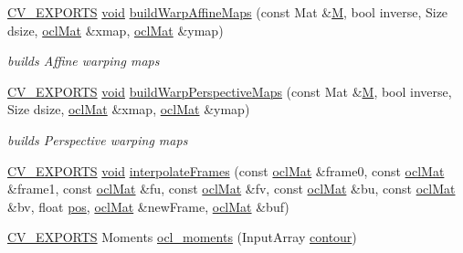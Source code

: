 \begin{DoxyCompactItemize}
\hyperlink{core_2types__c_8h_a1bf9f0e121b54272da02379cfccd0a2b}{C\-V\-\_\-\-E\-X\-P\-O\-R\-T\-S} \hyperlink{legacy_8hpp_a8bb47f092d473522721002c86c13b94e}{void} \hyperlink{namespacecv_1_1ocl_a53b08ee331f9b22d410e3f7a1f154081}{build\-Warp\-Affine\-Maps} (const Mat \&\hyperlink{tracking_8hpp_aa81fa9fd378ecf463757e9274a136e70}{M}, bool inverse, Size dsize, \hyperlink{classcv_1_1ocl_1_1oclMat}{ocl\-Mat} \&xmap, \hyperlink{classcv_1_1ocl_1_1oclMat}{ocl\-Mat} \&ymap)
\begin{DoxyCompactList}\small\item\em builds Affine warping maps \end{DoxyCompactList}\item 
\hyperlink{core_2types__c_8h_a1bf9f0e121b54272da02379cfccd0a2b}{C\-V\-\_\-\-E\-X\-P\-O\-R\-T\-S} \hyperlink{legacy_8hpp_a8bb47f092d473522721002c86c13b94e}{void} \hyperlink{namespacecv_1_1ocl_a833d8278ce3cc3a2f3bacd900b29a329}{build\-Warp\-Perspective\-Maps} (const Mat \&\hyperlink{tracking_8hpp_aa81fa9fd378ecf463757e9274a136e70}{M}, bool inverse, Size dsize, \hyperlink{classcv_1_1ocl_1_1oclMat}{ocl\-Mat} \&xmap, \hyperlink{classcv_1_1ocl_1_1oclMat}{ocl\-Mat} \&ymap)
\begin{DoxyCompactList}\small\item\em builds Perspective warping maps \end{DoxyCompactList}\item 
\hyperlink{core_2types__c_8h_a1bf9f0e121b54272da02379cfccd0a2b}{C\-V\-\_\-\-E\-X\-P\-O\-R\-T\-S} \hyperlink{legacy_8hpp_a8bb47f092d473522721002c86c13b94e}{void} \hyperlink{namespacecv_1_1ocl_a648325408f99a52fe9382683e5b1b095}{interpolate\-Frames} (const \hyperlink{classcv_1_1ocl_1_1oclMat}{ocl\-Mat} \&frame0, const \hyperlink{classcv_1_1ocl_1_1oclMat}{ocl\-Mat} \&frame1, const \hyperlink{classcv_1_1ocl_1_1oclMat}{ocl\-Mat} \&fu, const \hyperlink{classcv_1_1ocl_1_1oclMat}{ocl\-Mat} \&fv, const \hyperlink{classcv_1_1ocl_1_1oclMat}{ocl\-Mat} \&bu, const \hyperlink{classcv_1_1ocl_1_1oclMat}{ocl\-Mat} \&bv, float \hyperlink{highgui__c_8h_a2eaacae6060d194f31eafce8ca3c09dd}{pos}, \hyperlink{classcv_1_1ocl_1_1oclMat}{ocl\-Mat} \&new\-Frame, \hyperlink{classcv_1_1ocl_1_1oclMat}{ocl\-Mat} \&buf)
\item 
\hyperlink{core_2types__c_8h_a1bf9f0e121b54272da02379cfccd0a2b}{C\-V\-\_\-\-E\-X\-P\-O\-R\-T\-S} Moments \hyperlink{namespacecv_1_1ocl_a1f995dac86f142ed7c41a0553c29779f}{ocl\-\_\-moments} (Input\-Array \hyperlink{core__c_8h_adbc53f0a2ae231f4fb30fb213be65a50}{contour})
\item 

\end{DoxyCompactItemize}
